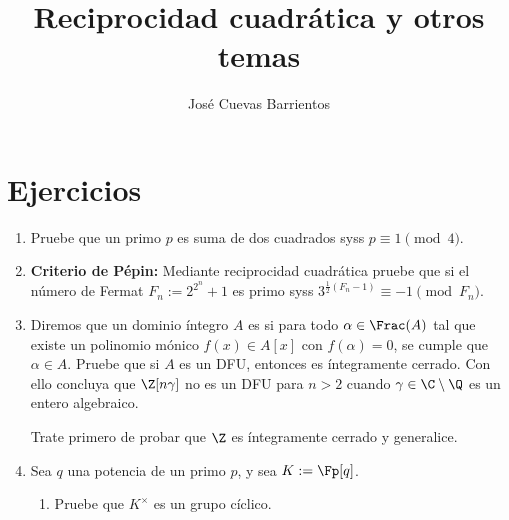\documentclass[11pt, reqno]{amsart}
\title{Reciprocidad cuadrática y otros temas}
\date{\DTMdate{2025-08-22}}
\author[José Cuevas]{José Cuevas Barrientos}
\begin{document}
\maketitle

\section{Ejercicios}
\begin{enumerate}
	\item Pruebe que un primo $p$ es suma de dos cuadrados syss $p \equiv 1 \pmod 4$.

	\item \textbf{Criterio de Pépin:}
		Mediante reciprocidad cuadrática pruebe que si el número de Fermat $F_n := 2^{2^n} + 1$ es primo syss $3^{\frac{1}{2}(F_n -
		1)} \equiv -1 \pmod{F_n}$.
		\nocite{granville:masterclass}

		\begin{comment}
			\lookup
			El interés detrás de este criterio es que es computacionalmente rápido calcular potencias módulo un número.
			A mano, puede emplear el criterio de Pépin para confirmar que $F_5 = 4\, 294\, 967\, 297$ no es primo (hallazgo de
			L.~Euler) y, si lo implementa en un lenguaje como \texttt{Python}, \texttt{Sage} u otro, puede verificar que $F_5, \dots,
			F_{10}$ son todos compuestos sin problema.
			(Si, por el contrario, trata de buscar sus factores primos, dará cuenta que son bastante altos, por lo que el criterio es
			bastante más eficaz.)
		\end{comment}

	\item Diremos que un dominio íntegro $A$ es  si para todo $\alpha \in \Frac(A)$ tal que existe un
		polinomio mónico $f(x) \in A[x]$ con $f(\alpha) = 0$, se cumple que $\alpha \in A$.
		Pruebe que si $A$ es un DFU, entonces es íntegramente cerrado.
		Con ello concluya que $\Z[n \gamma]$ no es un DFU para $n > 2$ cuando $\gamma \in \C \setminus \Q$ es un entero algebraico.

		\begin{hint}
			Trate primero de probar que $\Z$ es íntegramente cerrado y generalice.
		\end{hint}

	\item Sea $q$ una potencia de un primo $p$, y sea $K := \Fp[q]$.
		\begin{enumerate}
			\item Pruebe que $K^\times$ es un grupo cíclico.


\end{enumerate}
\end{enumerate}
\end{document}
